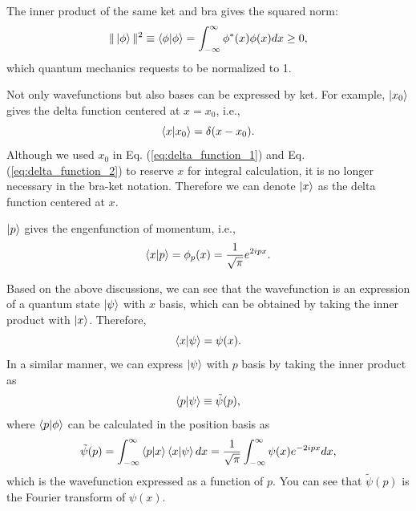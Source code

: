 The inner product of the same ket and bra gives the squared norm:
\begin{equation}
  \|\ket \phi\|^2 \equiv \braket{\phi|\phi} = \int_{-\infty}^{\infty}\phi^*(x)\phi(x)dx \geq 0,
\end{equation}
which quantum mechanics requests to be normalized to 1.

Not only wavefunctions but also bases can be expressed by ket. For example, $\ket {x_0}$ gives the delta function centered at $x = x_0$, i.e.,
\begin{equation}
  \braket{x|x_0} = \delta(x-x_0).
\end{equation}
Although we used $x_0$ in Eq. (\ref{eq:delta_function_1}) and Eq. (\ref{eq:delta_function_2}) to reserve $x$ for integral calculation, it is no longer necessary in the bra-ket notation. Therefore we can denote $\ket x$ as the delta function centered at $x$. 

$\ket p$ gives the engenfunction of momentum, i.e.,
\begin{equation}
  \braket{x|p} = \phi_p(x) = \frac{1}{\sqrt{\pi}}e^{2ipx}.
\end{equation}

Based on the above discussions, we can see that the wavefunction is an expression of a quantum state $\ket \psi$ with $x$ basis, which can be obtained by taking the inner product with $\ket x$. Therefore,
\begin{equation}
  \braket{x|\psi} = \psi(x).
\end{equation}
In a similar manner, we can express $\ket \psi$ with $p$ basis by taking the inner product as
\begin{equation}
  \braket{p|\psi} \equiv \tilde \psi(p),
\end{equation}
where $\braket{p|\phi}$ can be calculated in the position basis as
\begin{equation}
  \tilde\psi(p) = \int_{-\infty}^{\infty} \braket{p|x}\braket{x|\psi}dx = \frac{1}{\sqrt \pi}\int_{-\infty}^{\infty}\psi(x)e^{-2ipx}dx,
  \label{eq:tranform_position_momentum}
\end{equation}
which is the wavefunction expressed as a function of $p$. You can see that $\tilde \psi(p)$ is the Fourier transform of $\psi(x)$.

